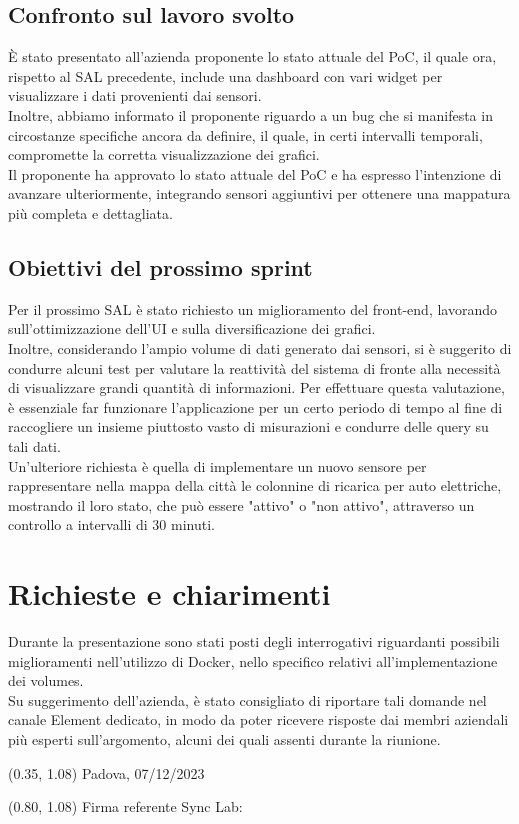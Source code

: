 \documentclass{article}
\begin{document}
    \subsection{Confronto sul lavoro svolto}
    È stato presentato all'azienda proponente lo stato attuale del PoC, il quale ora, rispetto al SAL precedente, include una dashboard con vari widget per visualizzare i dati provenienti dai sensori. \\
    Inoltre, abbiamo informato il proponente riguardo a un bug che si manifesta in circostanze specifiche ancora da definire, il quale, in certi intervalli temporali, compromette la corretta visualizzazione dei grafici. \\
    Il proponente ha approvato lo stato attuale del PoC e ha espresso l'intenzione di avanzare ulteriormente, integrando sensori aggiuntivi per ottenere una mappatura più completa e dettagliata.

    \subsection{Obiettivi del prossimo sprint}
    Per il prossimo SAL è stato richiesto un miglioramento del front-end, lavorando sull'ottimizzazione dell'UI e sulla diversificazione dei grafici. \\
    Inoltre, considerando l'ampio volume di dati generato dai sensori, si è suggerito di condurre alcuni test per valutare la reattività del sistema di fronte alla necessità di visualizzare grandi quantità di informazioni. Per effettuare questa valutazione, è essenziale far funzionare l'applicazione per un certo periodo di tempo al fine di raccogliere un insieme piuttosto vasto di misurazioni e condurre delle query su tali dati. \\
    Un'ulteriore richiesta è quella di implementare un nuovo sensore per rappresentare nella mappa della città le colonnine di ricarica per auto elettriche, mostrando il loro stato, che può essere "attivo" o "non attivo", attraverso un controllo a intervalli di 30 minuti.

\section{Richieste e chiarimenti}
    Durante la presentazione sono stati posti degli interrogativi riguardanti possibili miglioramenti nell'utilizzo di Docker, nello specifico relativi all'implementazione dei volumes. \\
    Su suggerimento dell'azienda, è stato consigliato di riportare tali domande nel canale Element dedicato, in modo da poter ricevere risposte dai membri aziendali più esperti sull'argomento, alcuni dei quali assenti durante la riunione.

\begin{textblock*}{\textwidth}(0.35\textwidth, 1.08\textheight)
    Padova, 07/12/2023
\end{textblock*}

\begin{textblock*}{\textwidth}(0.80\textwidth, 1.08\textheight)
        Firma referente Sync Lab:
\end{textblock*}
\end{document}
